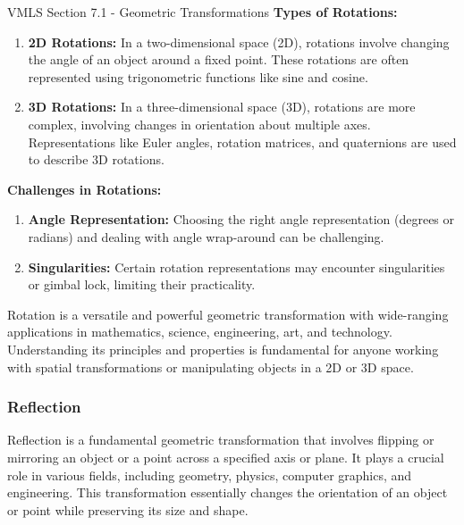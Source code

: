 \begin{notes}{VMLS Section 7.1 - Geometric Transformations}
    \textbf{Types of Rotations:}

    \begin{enumerate}
        \item \textbf{2D Rotations:} In a two-dimensional space (2D), rotations involve changing the angle of an object around a fixed point. These rotations are often represented using trigonometric 
        functions like sine and cosine.
        
        \item \textbf{3D Rotations:} In a three-dimensional space (3D), rotations are more complex, involving changes in orientation about multiple axes. Representations like Euler angles, rotation 
        matrices, and quaternions are used to describe 3D rotations.
    \end{enumerate}

    \textbf{Challenges in Rotations:}

    \begin{enumerate}
        \item \textbf{Angle Representation:} Choosing the right angle representation (degrees or radians) and dealing with angle wrap-around can be challenging.
        
        \item \textbf{Singularities:} Certain rotation representations may encounter singularities or gimbal lock, limiting their practicality.
    \end{enumerate}

    Rotation is a versatile and powerful geometric transformation with wide-ranging applications in mathematics, science, engineering, art, and technology. Understanding its principles and properties 
    is fundamental for anyone working with spatial transformations or manipulating objects in a 2D or 3D space.

    \subsubsection*{Reflection}

    Reflection is a fundamental geometric transformation that involves flipping or mirroring an object or a point across a specified axis or plane. It plays a crucial role in various fields, including 
    geometry, physics, computer graphics, and engineering. This transformation essentially changes the orientation of an object or point while preserving its size and shape. \vspace*{1em}


\end{notes}
